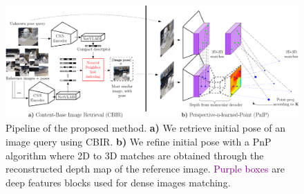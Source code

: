 \begin{figure}
	\centering
	\includegraphics[width=\linewidth]{method/pipeline}	
	\caption[Pipeline of our pose refinement method]{\label{fig:pipeline} Pipeline of the proposed method. \textbf{a)} We retrieve initial pose of an image query using CBIR. \textbf{b)} We refine initial pose with a PnP algorithm where 2D to 3D matches are obtained through the reconstructed depth map of the reference image. \textcolor{purple}{Purple boxes} are deep features blocks used for dense images matching.}
\end{figure}
